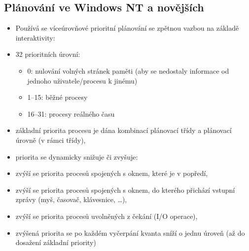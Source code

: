 \documentclass[a4paper, 11pt]{article}
\begin{document}
\subsection{Plánování ve Windows NT a novějších}
\begin{itemize}
    \item Používá se víceúrovňové prioritní plánování se zpětnou vazbou na základě interaktivity:
    \item 32 prioritních úrovní: 
    \begin{itemize}
        \item 0: nulování volných stránek paměti (aby se nedostaly informace od jednoho uživatele/procesu k jinému)
        \item 1--15: běžné procesy
        \item 16--31: procesy reálného času
    \end{itemize}
    \item základní priorita procesu je dána kombinací plánovací třídy a plánovací úrovně (v rámci třídy),
    \item priorita se dynamicky snižuje či zvyšuje:
    \item zvýší se priorita procesů spojených s oknem, které je v popředí,
    \item zvýší se priorita procesů spojených s oknem, do kterého přichází vstupní zprávy (myš, časovač, klávesnice, \ldots),
    \item zvýší se priorita procesů uvolněných z čekání (I/O operace),
    \item zvýšená priorita se po každém vyčerpání kvanta sníží o jednu úroveň (až do dosažení základní priority)
\end{itemize}
 
\end{document}
